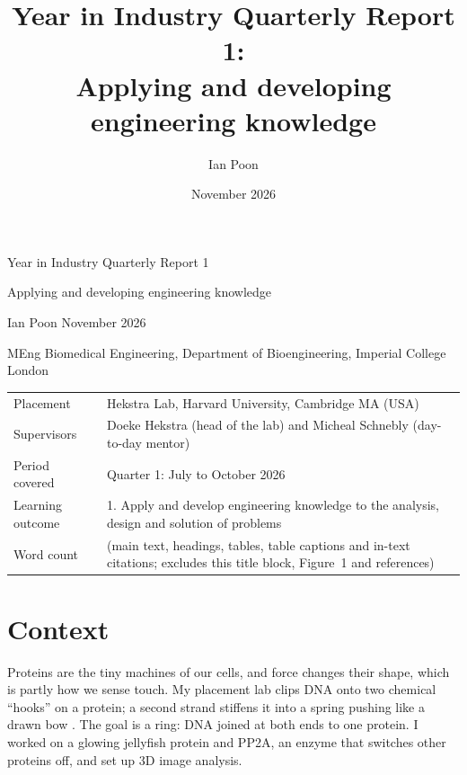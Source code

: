 \documentclass[a4paper,11pt]{article}
\title{Year in Industry Quarterly Report 1:\\[2pt] \Large Applying and developing engineering knowledge}
\author[1]{Ian Poon}
\affil[1]{MEng Biomedical Engineering, Department of Bioengineering, Imperial College London}
\date{November 2026}
\begin{document}
\begin{center}
{\LARGE Year in Industry Quarterly Report 1\par}\vspace{3pt}
{\Large Applying and developing engineering knowledge\par}\vspace{8pt}
{\large Ian Poon \textperiodcentered{} November 2026\par}\vspace{2pt}
{\normalsize MEng Biomedical Engineering, Department of Bioengineering, Imperial College London\par}
\vspace{6pt}
\small
\begin{tabularx}{0.94\textwidth}{@{}lL@{}}
\toprule
Placement & Hekstra Lab, Harvard University, Cambridge MA (USA) \\
Supervisors & Doeke Hekstra (head of the lab) and Micheal Schnebly (day-to-day mentor) \\
Period covered & Quarter 1: July to October 2026 \\
Learning outcome & 1. Apply and develop engineering knowledge to the analysis, design and solution of problems \\
Word count & \wordcount{} (main text, headings, tables, table captions and in-text citations; excludes this title block, Figure~1 and references) \\
\bottomrule
\end{tabularx}
\end{center}

\section*{Context}
Proteins are the tiny machines of our cells, and force changes their shape, which is partly how we sense touch. My placement lab clips DNA onto two chemical ``hooks'' on a protein; a second strand stiffens it into a spring pushing like a drawn bow \parencite{boral2026}. The goal is a ring: DNA joined at both ends to one protein. I worked on a glowing jellyfish protein and PP2A, an enzyme that switches other proteins off, and set up 3D image analysis.
\end{document}
